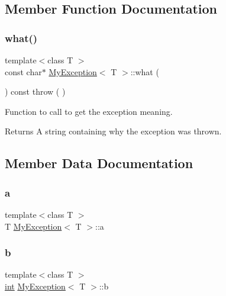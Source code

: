 \subsection{Member Function Documentation}
\mbox{\label{class_my_exception_ad0a4ef3c9897eb136fa37aec342406fd}} 
\subsubsection{\texorpdfstring{what()}{what()}}
{\footnotesize\ttfamily template$<$class T $>$ \\
const char$\ast$ \mbox{\hyperlink{class_my_exception}{My\+Exception}}$<$ T $>$\+::what (\begin{DoxyParamCaption}{ }\end{DoxyParamCaption}) const throw ( ) \hspace{0.3cm}{\ttfamily [inline]}}



Function to call to get the exception meaning. 

\begin{DoxyReturn}{Returns}
A string containing why the exception was thrown. 
\end{DoxyReturn}


\subsection{Member Data Documentation}
\mbox{\label{class_my_exception_ae4b514f28c88dc08e7a27bc04f3b4655}} 
\subsubsection{\texorpdfstring{a}{a}}
{\footnotesize\ttfamily template$<$class T $>$ \\
T \mbox{\hyperlink{class_my_exception}{My\+Exception}}$<$ T $>$\+::a}

\mbox{\label{class_my_exception_a42f4256beeac79f7ad8ad9682a9b83ee}} 
\subsubsection{\texorpdfstring{b}{b}}
{\footnotesize\ttfamily template$<$class T $>$ \\
\mbox{\hyperlink{draw_8hh_aa620a13339ac3a1177c86edc549fda9b}{int}} \mbox{\hyperlink{class_my_exception}{My\+Exception}}$<$ T $>$\+::b}

